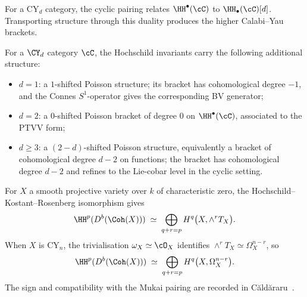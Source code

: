 For a CY$_d$ category, the cyclic pairing relates $\HH^\bullet(\cC)$ to $\HH_\bullet(\cC)[d]$. Transporting structure through this duality produces the higher Calabi--Yau brackets.

\begin{proposition}
\label{prop:cy-bracket-spectrum}
For a $\CY_d$ category $\cC$, the Hochschild invariants carry the following additional structure:
\begin{itemize}
 \item $d = 1$: a $1$-shifted Poisson structure; its bracket has
 cohomological degree $-1$, and the Connes $S^1$-operator gives the
 corresponding BV generator;
 \item $d = 2$: a $0$-shifted Poisson bracket of degree $0$ on
 $\HH^\bullet(\cC)$, associated to the PTVV form;
 \item $d \geq 3$: a $(2-d)$-shifted Poisson structure, equivalently
 a bracket of cohomological degree \(d-2\) on functions; the bracket has cohomological
 degree $d-2$ and refines to the Lie-cobar level in the cyclic setting.
\end{itemize}
\end{proposition}

\begin{theorem}
\label{thm:hkr-smooth}
For $X$ a smooth projective variety over $k$ of characteristic zero, the Hochschild--Kostant--Rosenberg isomorphism gives
\[
 \HH^p(D^b(\Coh(X))) \;\simeq\; \bigoplus_{q + r = p} H^q\big(X, \wedge^r T_X\big).
\]
When $X$ is CY$_n$, the trivialisation $\omega_X \simeq \cO_X$ identifies $\wedge^r T_X \simeq \Omega_X^{n - r}$, so
\[
 \HH^p(D^b(\Coh(X))) \;\simeq\; \bigoplus_{q + r = p} H^q\big(X, \Omega_X^{n - r}\big).
\]
The sign and compatibility with the Mukai pairing are recorded in C{\u a}ld{\u a}raru~\cite{Caldararu2005}.
\end{theorem}

